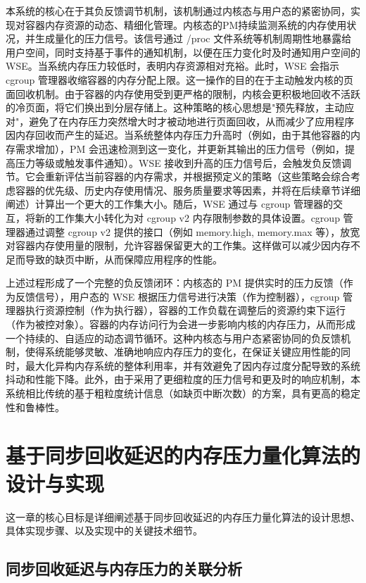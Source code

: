 本系统的核心在于其负反馈调节机制，该机制通过内核态与用户态的紧密协同，实现对容器内存资源的动态、精细化管理。内核态的PM持续监测系统的内存使用状况，并生成量化的压力信号。该信号通过 /proc 文件系统等机制周期性地暴露给用户空间，同时支持基于事件的通知机制，以便在压力变化时及时通知用户空间的WSE。当系统内存压力较低时，表明内存资源相对充裕。此时，WSE 会指示 cgroup 管理器收缩容器的内存分配上限。这一操作的目的在于主动触发内核的页面回收机制。由于容器的内存使用受到更严格的限制，内核会更积极地回收不活跃的冷页面，将它们换出到分层存储上。这种策略的核心思想是"预先释放，主动应对"，避免了在内存压力突然增大时才被动地进行页面回收，从而减少了应用程序因内存回收而产生的延迟。当系统整体内存压力升高时（例如，由于其他容器的内存需求增加），PM 会迅速检测到这一变化，并更新其输出的压力信号（例如，提高压力等级或触发事件通知）。WSE 接收到升高的压力信号后，会触发负反馈调节。它会重新评估当前容器的内存需求，并根据预定义的策略（这些策略会综合考虑容器的优先级、历史内存使用情况、服务质量要求等因素，并将在后续章节详细阐述）计算出一个更大的工作集大小。随后，WSE 通过与 cgroup 管理器的交互，将新的工作集大小转化为对 cgroup v2 内存限制参数的具体设置。cgroup 管理器通过调整 cgroup v2 提供的接口（例如 memory.high, memory.max 等），放宽对容器内存使用量的限制，允许容器保留更大的工作集。这样做可以减少因内存不足而导致的缺页中断，从而保障应用程序的性能。

上述过程形成了一个完整的负反馈闭环：内核态的 PM 提供实时的压力反馈（作为反馈信号），用户态的 WSE 根据压力信号进行决策（作为控制器），cgroup 管理器执行资源控制（作为执行器），容器的工作负载在调整后的资源约束下运行（作为被控对象）。容器的内存访问行为会进一步影响内核的内存压力，从而形成一个持续的、自适应的动态调节循环。这种内核态与用户态紧密协同的负反馈机制，使得系统能够灵敏、准确地响应内存压力的变化，在保证关键应用性能的同时，最大化异构内存系统的整体利用率，并有效避免了因内存过度分配导致的系统抖动和性能下降。此外，由于采用了更细粒度的压力信号和更及时的响应机制，本系统相比传统的基于粗粒度统计信息（如缺页中断次数）的方案，具有更高的稳定性和鲁棒性。


\section{基于同步回收延迟的内存压力量化算法的设计与实现}

这一章的核心目标是详细阐述基于同步回收延迟的内存压力量化算法的设计思想、具体实现步骤、以及实现中的关键技术细节。

\subsection{同步回收延迟与内存压力的关联分析}

